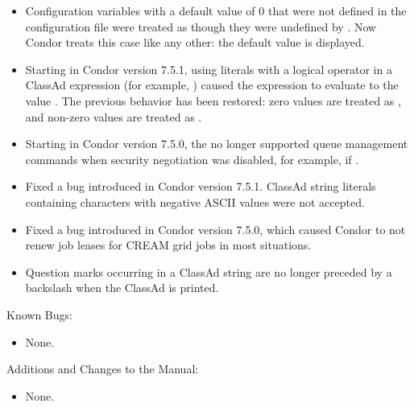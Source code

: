 \begin{itemize}

\item Configuration variables with a default value of 0
  that were not defined in the configuration file
  were treated as though they were undefined by .
  Now Condor treats this case like any other:
  the default value is displayed.

\item Starting in Condor version 7.5.1,
  using literals with a logical operator
  in a ClassAd expression (for example, ) caused the expression
  to evaluate to the value . The previous behavior has been
  restored: zero values are treated as ,
  and non-zero values are treated as .


\item Starting in Condor version 7.5.0,
  the  no longer supported queue
  management commands when security negotiation was disabled,
  for example, if .

\item Fixed a bug introduced in Condor version 7.5.1.
ClassAd string literals containing
characters with negative ASCII values were not accepted.

\item Fixed a bug introduced in Condor version 7.5.0,
which caused Condor to not renew
job leases for CREAM grid jobs in most situations.

\item Question marks occurring in a ClassAd string are no longer preceded
by a backslash when the ClassAd is printed.

\end{itemize}

\noindent Known Bugs:

\begin{itemize}

\item None.

\end{itemize}

\noindent Additions and Changes to the Manual:

\begin{itemize}

\item None.

\end{itemize}


